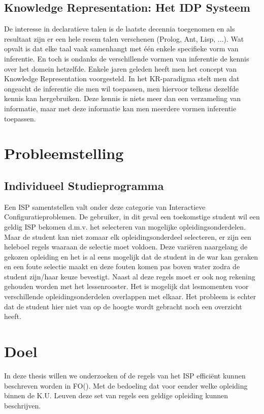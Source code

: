 \subsection{Knowledge Representation: Het IDP Systeem}
De interesse in declaratieve talen is de laatste decennia toegenomen en als resultaat zijn er een hele resem talen verschenen (Prolog, Ant, Lisp, ...). Wat opvalt is dat elke taal vaak samenhangt met \'{e}\'{e}n enkele specifieke vorm van inferentie. En toch is ondanks de verschillende vormen van inferentie de kennis over het domein hetzelfde. Enkele jaren geleden heeft men het concept van Knowledge Representation \citep{denecker2008building} voorgesteld. In het KR-paradigma stelt men dat ongeacht de inferentie die men wil toepassen, men hiervoor telkens dezelfde kennis kan hergebruiken. Deze kennis is niets meer dan een verzameling van informatie, maar met deze informatie kan men meerdere vormen inferentie toepassen. 

\section{Probleemstelling}

\subsection{Individueel Studieprogramma}
Een ISP samentstellen valt onder deze categorie van Interactieve Configuratieproblemen. De gebruiker, in dit geval een toekomstige student wil een geldig ISP bekomen d.m.v. het selecteren van mogelijke opleidingsonderdelen. Maar de student kan niet zomaar elk opleidingsonderdeel selecteren, er zijn een heleboel regels waaraan de selectie moet voldoen. Deze vari\"{e}ren naargelang de gekozen opleiding en het is al eens mogelijk dat de student in de war kan geraken en een foute selectie maakt en deze fouten komen pas boven water zodra de student zijn/haar keuze bevestigt. Naast al deze regels moet er ook nog rekening gehouden worden met het lessenrooster. Het is mogelijk dat lesmomenten voor verschillende opleidingsonderdelen overlappen met elkaar. Het probleem is echter dat de student hier niet van op de hoogte wordt gebracht noch een overzicht heeft. 

\section{Doel}
In deze thesis willen we onderzoeken of de regels van het ISP effici\"{e}nt kunnen beschreven worden in FO(\textperiodcentered). Met de bedoeling dat voor eender welke opleiding binnen de K.U. Leuven deze set van regels een geldige opleiding kunnen beschrijven. 

